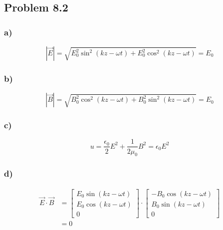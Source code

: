 \documentclass[../homework.tex]{subfiles}
\begin{document}
\subsection{Problem 8.2}
\subsubsection*{a)}
\begin{equation*}
	|\vec{E}| = \sqrt{E_0^2 \sin^2 (kz - \omega t) + E_0^2 \cos^2 (kz - \omega t)} = E_0
\end{equation*}

\subsubsection*{b)}
\begin{equation*}
	|\vec{B}| = \sqrt{B_0^2 \cos^2 (kz - \omega t) + B_0^2 \sin^2 (kz - \omega t)} = E_0
\end{equation*}

\subsubsection*{c)}
\begin{equation*}
	u = \frac{\epsilon_0}{2} E^2 + \frac{1}{2 \mu_0} B^2 = \epsilon_0 E^2
\end{equation*}

\subsubsection*{d)}
\begin{align*}
	\vec{E} \cdot \vec{B} & =
	\begin{bmatrix}
		E_0 \sin (kz - \omega t) \\
		E_0 \cos (kz - \omega t) \\
		0
	\end{bmatrix} \cdot
	\begin{bmatrix}
		-B_0 \cos (kz - \omega t) \\
		B_0 \sin (kz - \omega t)  \\
		0
	\end{bmatrix}   \\
	                      & = 0
\end{align*}
\end{document}
